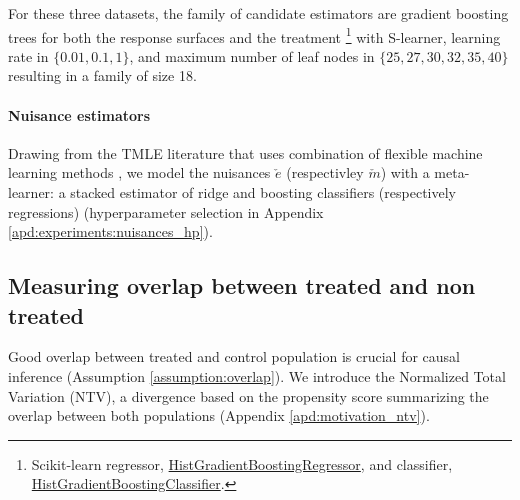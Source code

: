 \documentclass[a4paper,num-refs]{oup-contemporary}%
\begin{document}
For these three datasets, the family of candidate estimators are gradient
boosting trees for both the response surfaces and the treatment
\footnote{Scikit-learn regressor,
    \href{https://scikit-learn.org/stable/modules/generated/sklearn.ensemble.HistGradientBoostingRegressor.html}{HistGradientBoostingRegressor},
    and classifier,
    \href{https://scikit-learn.org/stable/modules/generated/sklearn.ensemble.HistGradientBoostingClassifier.html}{HistGradientBoostingClassifier}.}
with S-learner, learning rate
in $\{0.01, 0.1, 1\}$, and maximum number of leaf nodes in $\{25, 27, 30, 32,
    35, 40\}$ resulting in a family of size 18.

\paragraph{Nuisance estimators}

Drawing from the TMLE literature that uses combination of flexible
machine learning methods \cite{schuler_targeted_2017}, we model the nuisances
$\check e$ (respectivley $\check m$) with a meta-learner: a stacked estimator of ridge
and boosting classifiers (respectively regressions) (hyperparameter selection in Appendix \ref{apd:experiments:nuisances_hp}).


\subsection{Measuring overlap between treated and non treated}\label{subsec:measuring_overlap}

Good overlap between treated and control population is crucial for causal
inference (Assumption \ref{assumption:overlap}). We introduce the
Normalized Total Variation (NTV), a divergence based on the propensity score
summarizing the overlap between both populations (Appendix
\ref{apd:motivation_ntv}).
\end{document}
